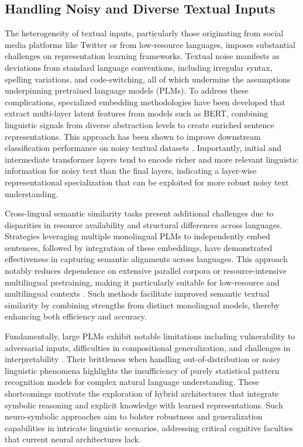 \documentclass[sigconf]{acmart}
\begin{document}
\subsection{Handling Noisy and Diverse Textual Inputs}

The heterogeneity of textual inputs, particularly those originating from social media platforms like Twitter or from low-resource languages, imposes substantial challenges on representation learning frameworks. Textual noise manifests as deviations from standard language conventions, including irregular syntax, spelling variations, and code-switching, all of which undermine the assumptions underpinning pretrained language models (PLMs). To address these complications, specialized embedding methodologies have been developed that extract multi-layer latent features from models such as BERT, combining linguistic signals from diverse abstraction levels to create enriched sentence representations. This approach has been shown to improve downstream classification performance on noisy textual datasets \cite{ref37}. Importantly, initial and intermediate transformer layers tend to encode richer and more relevant linguistic information for noisy text than the final layers, indicating a layer-wise representational specialization that can be exploited for more robust noisy text understanding.

Cross-lingual semantic similarity tasks present additional challenges due to disparities in resource availability and structural differences across languages. Strategies leveraging multiple monolingual PLMs to independently embed sentences, followed by integration of these embeddings, have demonstrated effectiveness in capturing semantic alignments across languages. This approach notably reduces dependence on extensive parallel corpora or resource-intensive multilingual pretraining, making it particularly suitable for low-resource and multilingual contexts \cite{ref31,ref38}. Such methods facilitate improved semantic textual similarity by combining strengths from distinct monolingual models, thereby enhancing both efficiency and accuracy.

Fundamentally, large PLMs exhibit notable limitations including vulnerability to adversarial inputs, difficulties in compositional generalization, and challenges in interpretability \cite{ref7}. Their brittleness when handling out-of-distribution or noisy linguistic phenomena highlights the insufficiency of purely statistical pattern recognition models for complex natural language understanding. These shortcomings motivate the exploration of hybrid architectures that integrate symbolic reasoning and explicit knowledge with learned representations. Such neuro-symbolic approaches aim to bolster robustness and generalization capabilities in intricate linguistic scenarios, addressing critical cognitive faculties that current neural architectures lack.
\end{document}

